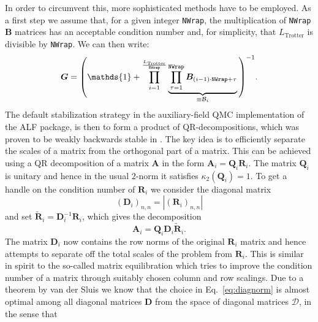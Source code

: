 In order to circumvent this, more sophisticated methods have to be employed. As a first step we assume that, for a given integer \texttt{NWrap}, the multiplication of \texttt{NWrap} $\bm{B}$ matrices has an acceptable condition number and, for simplicity, that $L_{\text{Trotter}}$ is divisible by \texttt{NWrap}. We can then write:
\begin{equation}
\bm{G} = \Vast( \mathds{1} + \prod\limits_{ i = 1}^{\frac{L_{\text{Trotter}}} {\texttt{NWrap}}}       \underbrace{\prod_{\tau=1}^{\texttt{NWrap}} \bm{B}_{(i-1)  \cdot  \texttt{NWrap}+ \tau} }_{ \equiv \mathcal{\bm{B}}_i} \Vast)^{-1}.
\end{equation}
The default stabilization strategy in the auxiliary-field QMC implementation of the ALF package, is then to form a product of QR-decompositions, which was proven to be weakly backwards stable in \cite{Bai2011}.
The key idea is to efficiently separate the scales of a matrix from the orthogonal part of a matrix.
This can be achieved using a QR decomposition of a matrix $\bm{A}$ in the form $\bm{A}_i = \bm{Q}_i \bm{R}_i$. The matrix $\bm{Q}_i$ is unitary and hence in the usual $2$-norm it satisfies $\kappa_2(\bm{Q}_i) = 1$.
To get a handle on the condition number of $\bm{R}_i$ we consider the
diagonal matrix
\begin{equation}
(\bm{D}_i)_{n,n} = |(\bm{R}_i)_{n,n}|
\label{eq:diagnorm}
\end{equation}
and set $\tilde{\bm{R}}_i = \bm{D}_i^{-1} \bm{R}_i$, which gives the decomposition
\begin{equation}
\bm{A}_i = \bm{Q}_i \bm{D}_i \tilde{\bm{R}}_i.
\end{equation}
The matrix $\bm{D}_i$ now contains the row norms of the original $\bm{R}_i$ matrix and hence attempts to separate off the total scales of the problem from $\bm{R}_i$.
This is similar in spirit to the so-called matrix equilibration which tries to improve the condition number of a matrix through suitably chosen column and row scalings.
Due to a theorem by van der Sluis \cite{vanderSluis1969} we know that the choice in Eq.~\eqref{eq:diagnorm} is almost optimal among all diagonal matrices $\bm{D}$ from the space of diagonal matrices $\mathcal{D}$, in the sense that
